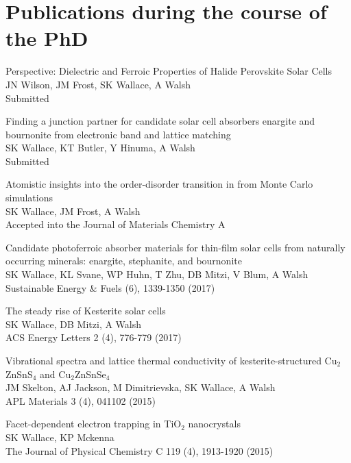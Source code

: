 \documentclass[11pt, twoside]{report}
\begin{document}
\section*{Publications during the course of the PhD}
\begin{etaremune}
\item Perspective: Dielectric and Ferroic Properties of Halide Perovskite Solar Cells\\
JN Wilson, JM Frost, SK Wallace, A Walsh\\
Submitted
\item Finding a junction partner for candidate solar cell absorbers enargite and bournonite from electronic band and lattice matching\\
SK Wallace, KT Butler, Y Hinuma, A Walsh\\
Submitted
\item Atomistic insights into the order-disorder transition in {\CZTS} from Monte Carlo simulations \\
SK Wallace, JM Frost, A Walsh\\
Accepted into the Journal of Materials Chemistry A
\item Candidate photoferroic absorber materials for thin-film solar cells from naturally occurring minerals: enargite, stephanite, and bournonite\\
SK Wallace, KL Svane, WP Huhn, T Zhu, DB Mitzi, V Blum, A Walsh\\ Sustainable Energy \& Fuels  (6), 1339-1350 (2017)
\item The steady rise of Kesterite solar cells\\ SK Wallace, DB Mitzi, A Walsh\\ ACS Energy Letters 2 (4), 776-779 (2017)
\item Vibrational spectra and lattice thermal conductivity of kesterite-structured Cu$_2$ZnSnS$_4$ and Cu$_2$ZnSnSe$_4$\\ JM Skelton, AJ Jackson, M Dimitrievska, SK Wallace, A Walsh\\ APL Materials 3 (4), 041102 (2015)
\item Facet-dependent electron trapping in TiO$_2$ nanocrystals\\ SK Wallace, KP Mckenna\\ The Journal of Physical Chemistry C 119 (4), 1913-1920 (2015)
\end{etaremune}


\tableofcontents
{}
\listoffigures
{}
\listoftables
{}
\end{document}
